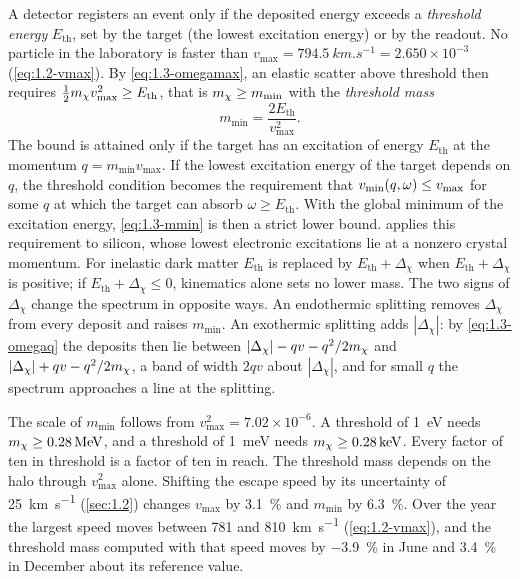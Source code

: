 A detector registers an event only if the deposited energy exceeds a \emph{threshold energy} $E_{\mathrm{th}}$, set by the target (the lowest excitation energy) or by the readout. No particle in the laboratory is faster than $v_{\mathrm{max}} = \SI{794.5}{km.s^{-1}} = 2.650\times10^{-3}$ (\cref{eq:1.2-vmax}). By \cref{eq:1.3-omegamax}, an elastic scatter above threshold then requires $\tfrac12m_{\chi} v_{\mathrm{max}}^2 \ge E_{\mathrm{th}}$, that is $m_{\chi} \ge m_{\mathrm{min}}$ with the \emph{threshold mass}
\begin{equation}
  m_{\mathrm{min}} = \frac{2E_{\mathrm{th}}}{v_{\mathrm{max}}^2} .
  \label{eq:1.3-mmin}
\end{equation}
The bound is attained only if the target has an excitation of energy $E_{\mathrm{th}}$ at the momentum $q = m_{\mathrm{min}}v_{\mathrm{max}}$. If the lowest excitation energy of the target depends on $q$, the threshold condition becomes the requirement that $v_{\mathrm{min}}(q, \omega) \le v_{\mathrm{max}}$ for some $q$ at which the target can absorb $\omega \ge E_{\mathrm{th}}$. With the global minimum of the excitation energy, \cref{eq:1.3-mmin} is then a strict lower bound.  applies this requirement to silicon, whose lowest electronic excitations lie at a nonzero crystal momentum. For inelastic dark matter $E_{\mathrm{th}}$ is replaced by $E_{\mathrm{th}} + \Delta_\chi$ when $E_{\mathrm{th}} + \Delta_\chi$ is positive; if $E_{\mathrm{th}} + \Delta_\chi \le 0$, kinematics alone sets no lower mass. The two signs of $\Delta_\chi$ change the spectrum in opposite ways. An endothermic splitting removes $\Delta_\chi$ from every deposit and raises $m_{\mathrm{min}}$. An exothermic splitting adds $|\Delta_\chi|$: by \cref{eq:1.3-omegaq} the deposits then lie between $|\Delta_\chi| - qv - q^2/2m_{\chi}$ and $|\Delta_\chi| + qv - q^2/2m_{\chi}$, a band of width $2qv$ about $|\Delta_\chi|$, and for small $q$ the spectrum approaches a line at the splitting.

The scale of $m_{\mathrm{min}}$ follows from $v_{\mathrm{max}}^2 = 7.02\times10^{-6}$. A threshold of \SI{1}{eV} needs $m_{\chi} \ge \SI{0.28}{MeV}$, and a threshold of \SI{1}{meV} needs $m_{\chi} \ge \SI{0.28}{keV}$. Every factor of ten in threshold is a factor of ten in reach. The threshold mass depends on the halo through $v_{\mathrm{max}}^2$ alone. Shifting the escape speed by its uncertainty of \SI{25}{km.s^{-1}} (\cref{sec:1.2}) changes $v_{\mathrm{max}}$ by \SI{3.1}{\percent} and $m_{\mathrm{min}}$ by \SI{6.3}{\percent}. Over the year the largest speed moves between 781 and \SI{810}{km.s^{-1}} (\cref{eq:1.2-vmax}), and the threshold mass computed with that speed moves by \SI{-3.9}{\percent} in June and \SI{+3.4}{\percent} in December about its reference value.

